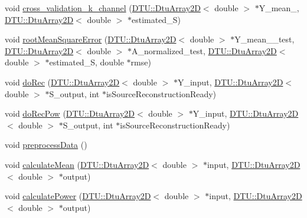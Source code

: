 \begin{DoxyCompactItemize}
\item 
void \hyperlink{classSbs2SourceReconstructionSparse_ae4fa7617ed4e1b06991ce00da77d3dae}{cross\-\_\-validation\-\_\-k\-\_\-channel} (\hyperlink{classDTU_1_1DtuArray2D}{D\-T\-U\-::\-Dtu\-Array2\-D}$<$ double $>$ $\ast$Y\-\_\-mean\-\_, \hyperlink{classDTU_1_1DtuArray2D}{D\-T\-U\-::\-Dtu\-Array2\-D}$<$ double $>$ $\ast$estimated\-\_\-\-S)
\item 
void \hyperlink{classSbs2SourceReconstructionSparse_ae18dc4db1615715a25cf07085c76c9ca}{root\-Mean\-Square\-Error} (\hyperlink{classDTU_1_1DtuArray2D}{D\-T\-U\-::\-Dtu\-Array2\-D}$<$ double $>$ $\ast$Y\-\_\-mean\-\_\-\_\-test, \hyperlink{classDTU_1_1DtuArray2D}{D\-T\-U\-::\-Dtu\-Array2\-D}$<$ double $>$ $\ast$A\-\_\-normalized\-\_\-test, \hyperlink{classDTU_1_1DtuArray2D}{D\-T\-U\-::\-Dtu\-Array2\-D}$<$ double $>$ $\ast$estimated\-\_\-\-S, double $\ast$rmse)
\item 
void \hyperlink{classSbs2SourceReconstructionSparse_a715684d11b00b3fbeba117730bbfe7ae}{do\-Rec} (\hyperlink{classDTU_1_1DtuArray2D}{D\-T\-U\-::\-Dtu\-Array2\-D}$<$ double $>$ $\ast$Y\-\_\-input, \hyperlink{classDTU_1_1DtuArray2D}{D\-T\-U\-::\-Dtu\-Array2\-D}$<$ double $>$ $\ast$S\-\_\-output, int $\ast$is\-Source\-Reconstruction\-Ready)
\item 
void \hyperlink{classSbs2SourceReconstructionSparse_af444570b73ff117a96a2555e57209616}{do\-Rec\-Pow} (\hyperlink{classDTU_1_1DtuArray2D}{D\-T\-U\-::\-Dtu\-Array2\-D}$<$ double $>$ $\ast$Y\-\_\-input, \hyperlink{classDTU_1_1DtuArray2D}{D\-T\-U\-::\-Dtu\-Array2\-D}$<$ double $>$ $\ast$S\-\_\-output, int $\ast$is\-Source\-Reconstruction\-Ready)
\item 
void \hyperlink{classSbs2SourceReconstructionSparse_a1b1e7a6b575f2b73198d5a01f17775c8}{preprocess\-Data} ()
\item 
void \hyperlink{classSbs2SourceReconstructionSparse_a63f21863593eea269b4bbba988872213}{calculate\-Mean} (\hyperlink{classDTU_1_1DtuArray2D}{D\-T\-U\-::\-Dtu\-Array2\-D}$<$ double $>$ $\ast$input, \hyperlink{classDTU_1_1DtuArray2D}{D\-T\-U\-::\-Dtu\-Array2\-D}$<$ double $>$ $\ast$output)
\item 
void \hyperlink{classSbs2SourceReconstructionSparse_a04505e279c6030ac70461aa7abf551d2}{calculate\-Power} (\hyperlink{classDTU_1_1DtuArray2D}{D\-T\-U\-::\-Dtu\-Array2\-D}$<$ double $>$ $\ast$input, \hyperlink{classDTU_1_1DtuArray2D}{D\-T\-U\-::\-Dtu\-Array2\-D}$<$ double $>$ $\ast$output)
\end{DoxyCompactItemize}


